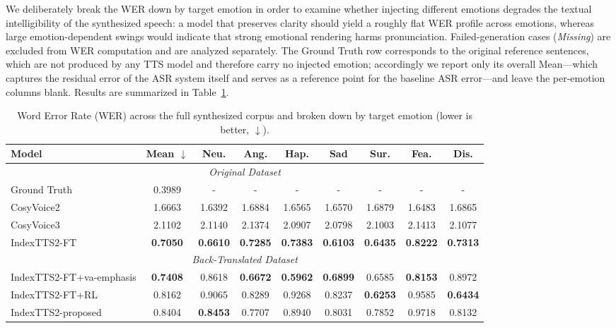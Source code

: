 We deliberately break the WER down by target emotion in order to examine whether injecting different emotions degrades the textual intelligibility of the synthesized speech: a model that preserves clarity should yield a roughly flat WER profile across emotions, whereas large emotion-dependent swings would indicate that strong emotional rendering harms pronunciation. Failed-generation cases (\textit{Missing}) are excluded from WER computation and are analyzed separately. The Ground Truth row corresponds to the original reference sentences, which are not produced by any TTS model and therefore carry no injected emotion; accordingly we report only its overall Mean---which captures the residual error of the ASR system itself and serves as a reference point for the baseline ASR error---and leave the per-emotion columns blank. Results are summarized in Table~\ref{tab:wer_results}.

\begin{table}[htbp]
\centering
\small
\caption{Word Error Rate (WER) across the full synthesized corpus and broken down by target emotion (lower is better, $\downarrow$).}
\label{tab:wer_results}
\setlength{\tabcolsep}{3pt}
\begin{tabular}{lcccccccc}
\toprule
\textbf{Model} & \textbf{Mean $\downarrow$} & \textbf{Neu.} & \textbf{Ang.} & \textbf{Hap.} & \textbf{Sad} & \textbf{Sur.} & \textbf{Fea.} & \textbf{Dis.} \\
\midrule
\multicolumn{9}{c}{\textit{Original Dataset}} \\
\midrule
Ground Truth & 0.3989 & - & - & - & - & - & - & - \\
CosyVoice2 & 1.6663 & 1.6392 & 1.6884 & 1.6565 & 1.6570 & 1.6879 & 1.6483 & 1.6865 \\
CosyVoice3 & 2.1102 & 2.1140 & 2.1374 & 2.0907 & 2.0798 & 2.1003 & 2.1413 & 2.1077 \\
IndexTTS2-FT & \textbf{0.7050} & \textbf{0.6610} & \textbf{0.7285} & \textbf{0.7383} & \textbf{0.6103} & \textbf{0.6435} & \textbf{0.8222} & \textbf{0.7313} \\
\midrule
\multicolumn{9}{c}{\textit{Back-Translated Dataset}} \\
\midrule
IndexTTS2-FT+va-emphasis & \textbf{0.7408} & 0.8618 & \textbf{0.6672} & \textbf{0.5962} & \textbf{0.6899} & 0.6585 & \textbf{0.8153} & 0.8972 \\
IndexTTS2-FT+RL & 0.8162 & 0.9065 & 0.8289 & 0.9268 & 0.8237 & \textbf{0.6253} & 0.9585 & \textbf{0.6434} \\
IndexTTS2-proposed & 0.8404 & \textbf{0.8453} & 0.7707 & 0.8940 & 0.8031 & 0.7852 & 0.9718 & 0.8132 \\
\bottomrule
\end{tabular}
\end{table}


